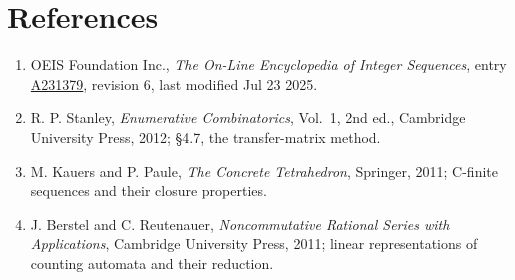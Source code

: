 \documentclass[11pt]{article}
\theoremstyle{definition}
\begin{document}
\section{References}

\begin{enumerate}

\item OEIS Foundation Inc., \emph{The On-Line Encyclopedia of Integer Sequences}, entry \href{https://oeis.org/A231379}{A231379}, revision 6, last modified Jul 23 2025.

\item R. P. Stanley, \emph{Enumerative Combinatorics}, Vol.~1, 2nd ed., Cambridge University Press, 2012; \S4.7, the transfer-matrix method.

\item M. Kauers and P. Paule, \emph{The Concrete Tetrahedron}, Springer, 2011; C-finite sequences and their closure properties.

\item J. Berstel and C. Reutenauer, \emph{Noncommutative Rational Series with Applications}, Cambridge University Press, 2011; linear representations of counting automata and their reduction.

\end{enumerate}
\end{document}
